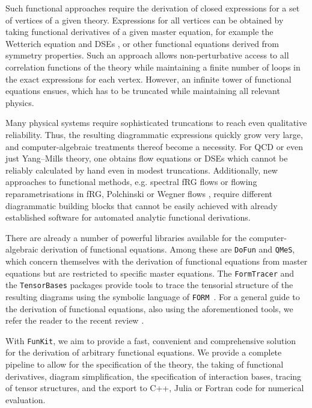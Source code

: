 \documentclass[preprint,10pt,sort&compress]{elsarticle}
\newcommand{\FunKit}{\texttt{FunKit}\xspace}
\newcommand{\TensorBases}{\texttt{TensorBases}\xspace}
\newcommand{\FormTracer}{\texttt{FormTracer}\xspace}
\newcommand{\QMeS}{\texttt{QMeS}\xspace}
\newcommand{\DoFun}{\texttt{DoFun}\xspace}
\newcommand{\FORM}{\texttt{FORM}\xspace}
\begin{document}
Such functional approaches require the derivation of closed expressions for a set of vertices of a given theory. Expressions for all vertices can be obtained by taking functional derivatives of a given master equation, for example the Wetterich equation \cite{Wetterich:1992yh} and DSEs \cite{Dyson1, Schwinger1, Schwinger2}, or other functional equations derived from symmetry properties.
Such an approach allows non-perturbative access to all correlation functions of the theory while maintaining a finite number of loops in the exact expressions for each vertex. However, an infinite tower of functional equations ensues, which has to be truncated while maintaining all relevant physics.

Many physical systems require sophisticated truncations to reach even qualitative reliability. Thus, the resulting diagrammatic expressions quickly grow very large, and computer-algebraic treatments thereof become a necessity.
For QCD or even just Yang--Mills theory, one obtains flow equations or DSEs which cannot be reliably calculated by hand even in modest truncations.
Additionally, new approaches to functional methods, e.g. spectral fRG flows \cite{Braun:2022mgx} or flowing reparametrisations in fRG, Polchinski or Wegner flows \cite{Ihssen:2023nqd, Ihssen:2024ihp}, require different diagrammatic building blocks that cannot be easily achieved with already established software for automated analytic functional derivations.

There are already a number of powerful libraries available for the computer-algebraic derivation of functional equations. Among these are \DoFun \cite{Alkofer:2008nt,Huber:2011qr,Huber:2019dkb} and \QMeS \cite{Pawlowski:2021tkk}, which concern themselves with the derivation of functional equations from master equations but are restricted to specific master equations. 
The \FormTracer \cite{Cyrol:2016zqb} and the \TensorBases packages \cite{Braun:2025gvq} provide tools to trace the tensorial structure of the resulting diagrams using the symbolic language of \FORM~\cite{Vermaseren:2000nd,Ruijl:2017dtg}.
For a general guide to the derivation of functional equations, also using the aforementioned tools, we refer the reader to the recent review \cite{Huber:2025cbd}.

With \FunKit, we aim to provide a fast, convenient and comprehensive solution for the derivation of arbitrary functional equations.
We provide a complete pipeline to allow for the specification of the theory, the taking of functional derivatives, diagram simplification, the specification of interaction bases, tracing of tensor structures, and the export to C++, Julia or Fortran code for numerical evaluation.
\end{document}
